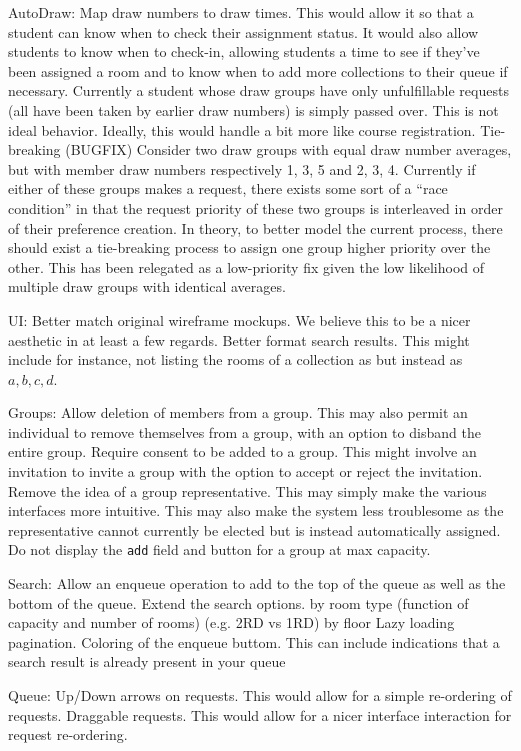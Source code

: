 \begin{outline}
\1 AutoDraw:
  \2 Map draw numbers to draw times.
    \3 This would allow it so that a student can know when to check their
    assignment status.
    \3 It would also allow students to know when to check-in, allowing students
    a time to see if they've been assigned a room and to know when to add more
    collections to their queue if necessary. Currently a student whose draw
    groups have only unfulfillable requests (all have been taken by earlier draw
    numbers) is simply passed over. This is not ideal behavior. Ideally, this
    would handle a bit more like course registration.
  \2 Tie-breaking (BUGFIX)
    \3 Consider two draw groups with equal draw number averages, but with member
    draw numbers respectively 1, 3, 5 and 2, 3, 4. Currently if either of these
    groups makes a request, there exists some sort of a ``race condition'' in
    that the request priority of these two groups is interleaved in order of
    their preference creation. In theory, to better model the current process,
    there should exist a tie-breaking process to assign one group higher
    priority over the other. This has been relegated as a low-priority fix given
    the low likelihood of multiple draw groups with identical averages.

\1 UI:
  \2 Better match original wireframe mockups.
    \3 We believe this to be a nicer aesthetic in at least a few regards.
  \2 Better format search results.
    \3 This might include for instance, not listing the rooms of a collection as
     but instead as \(a, b, c, d\).

\1 Groups:
  \2 Allow deletion of members from a group.
    \3 This may also permit an individual to remove themselves from a group,
    with an option to disband the entire group.
  \2 Require consent to be added to a group.
    \3 This might involve an invitation to invite a group with the option to
    accept or reject the invitation.
  \2 Remove the idea of a group representative.
    \3 This may simply make the various interfaces more intuitive.
    \3 This may also make the system less troublesome as the representative
    cannot currently be elected but is instead automatically assigned.
  \2 Do not display the \texttt{add} field and button for a group at max
  capacity.

\1 Search:
  \2 Allow an enqueue operation to add to the top of the queue as well as the
  bottom of the queue.
  \2 Extend the search options.
    \3 by room type (function of capacity and number of rooms) (e.g. 2RD vs 1RD)
    \3 by floor
  \2 Lazy loading pagination.
  \2 Coloring of the enqueue buttom.
    \3 This can include indications that a search result is already present in
    your queue

\1 Queue:
  \2 Up/Down arrows on requests.
    \3 This would allow for a simple re-ordering of requests.
  \2 Draggable requests.
    \3 This would allow for a nicer interface interaction for request
    re-ordering.
\end{outline}